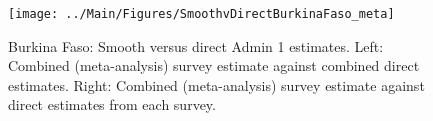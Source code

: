 \documentclass[12pt]{article}\usepackage[]{graphicx}\usepackage[]{color}
\newenvironment{knitrout}{}{} %
\begin{document}

\begin{knitrout}
\color{fgcolor}\begin{figure}[bht]

{\centering \texttt{[image: ../Main/Figures/SmoothvDirectBurkinaFaso\_meta]} 

}

\caption[Burkina Faso]{Burkina Faso: Smooth versus direct Admin 1 estimates. Left: Combined (meta-analysis) survey estimate against combined direct estimates. Right: Combined (meta-analysis) survey estimate against direct estimates from each survey.}\label{fig:unnamed-chunk-23}
\end{figure}


\end{knitrout}
\end{document}
